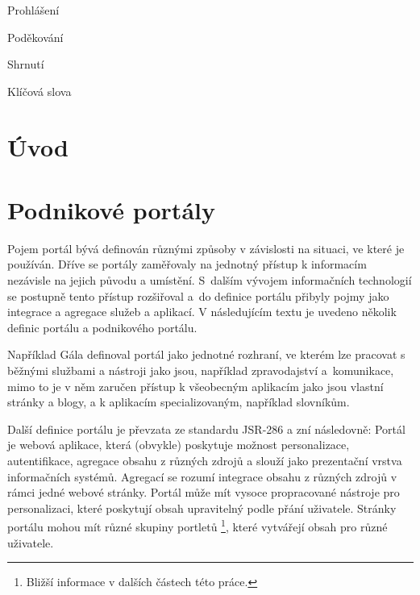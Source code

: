 \documentclass{fithesis}
\begin{document}
\FrontMatter
\ThesisTitlePage

\begin{ThesisDeclaration}
Prohlášení\AdvisorName
\end{ThesisDeclaration}

\begin{ThesisThanks}
Poděkování
\end{ThesisThanks}

\begin{ThesisAbstract}
Shrnutí
\end{ThesisAbstract}

\begin{ThesisKeyWords}
Klíčová slova
\end{ThesisKeyWords}


\MainMatter
\setcounter{secnumdepth}{4}
\tableofcontents

\chapter*{Úvod}


\chapter{Podnikové portály}

Pojem portál bývá definován různými způsoby v závislosti na situaci, ve které je používán. Dříve se portály zaměřovaly na jednotný přístup k informacím nezávisle na jejich původu a umístění. S~dalším vývojem informačních technologií se postupně tento přístup rozšiřoval a~do definice portálu přibyly pojmy jako integrace a agregace služeb a aplikací. V následujícím textu je uvedeno několik definic portálu a podnikového portálu.

Například Gála definoval portál jako jednotné rozhraní, ve kterém lze pracovat s běžnými službami a nástroji jako jsou, například zpravodajství a~komunikace, mimo to je v něm zaručen přístup k všeobecným aplikacím jako jsou vlastní stránky a blogy, a k aplikacím specializovaným, například slovníkům. \cite{gala}

Další definice portálu je převzata ze standardu JSR-286 a zní následovně: Portál je webová aplikace, která (obvykle) poskytuje možnost personalizace, autentifikace, agregace obsahu z různých zdrojů a slouží jako prezentační vrstva informačních systémů. Agregací se rozumí integrace obsahu z různých zdrojů v rámci jedné webové stránky. Portál může mít vysoce propracované nástroje pro personalizaci, které poskytují obsah upravitelný podle přání uživatele. Stránky portálu mohou mít různé skupiny portletů \footnote[1]{Bližší informace v dalších částech této práce.}, které vytvářejí obsah pro různé uživatele.  \cite{jsr-286}
\end{document}
